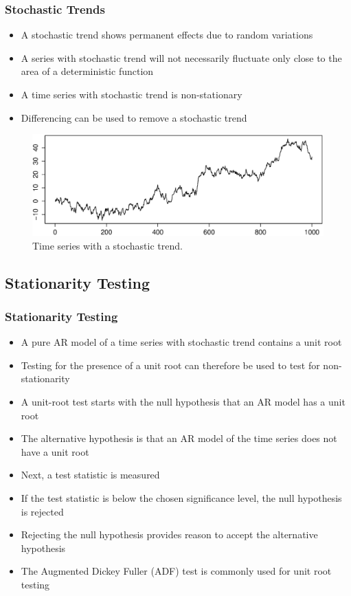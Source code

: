 \documentclass[presentation]{beamer}
\begin{document}
\begin{frame}[t]
\frametitle{Stochastic Trends}
\footnotesize{
\begin{itemize}
\item{A stochastic trend shows permanent effects due to random variations}
\item{A series with stochastic trend will not necessarily fluctuate only close to the area of a deterministic function}
\item{A time series with stochastic trend is non-stationary}
\item{Differencing can be used to remove a stochastic trend}
\end{itemize}
}
\vspace{-.2cm}
\begin{figure}[htbp]
\begin{center}
\includegraphics[width=\textwidth]{assets/stochastic_trend.eps}
\caption{Time series with a stochastic trend.}
\end{center}
\end{figure}
\end{frame}

\subsection{Stationarity Testing}

\begin{frame}[t]
\frametitle{Stationarity Testing}
\footnotesize{
\begin{itemize}
\item{A pure AR model of a time series with stochastic trend contains a unit root \cite{franses1998time}}
\item{Testing for the presence of a unit root can therefore be used to test for non-stationarity}
\item{A unit-root test starts with the null hypothesis that an AR model has a unit root}
\item{The alternative hypothesis is that an AR model of the time series does not have a unit root}
\item{Next, a test statistic is measured}
\item{If the test statistic is below the chosen significance level, the null hypothesis is rejected}
\item{Rejecting the null hypothesis provides reason to accept the alternative hypothesis}
\item{The Augmented Dickey Fuller (ADF) test is commonly used for unit root testing}
\end{itemize}
}
\end{frame}
\end{document}
